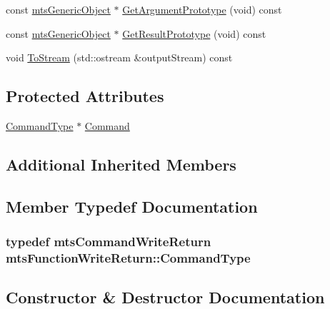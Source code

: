 \begin{DoxyCompactItemize}
\item 
const \hyperlink{classmts_generic_object}{mts\+Generic\+Object} $\ast$ \hyperlink{classmts_function_write_return_a36b02957cee1e6f144377862aa5c8819}{Get\+Argument\+Prototype} (void) const 
\item 
const \hyperlink{classmts_generic_object}{mts\+Generic\+Object} $\ast$ \hyperlink{classmts_function_write_return_a13ce482e4e34283e27f63654a61c3e67}{Get\+Result\+Prototype} (void) const 
\item 
void \hyperlink{classmts_function_write_return_a4cb7b8d402ca8863ccd6524253cb735f}{To\+Stream} (std\+::ostream \&output\+Stream) const 
\end{DoxyCompactItemize}
\subsection*{Protected Attributes}
\begin{DoxyCompactItemize}
\item 
\hyperlink{classmts_function_write_return_ac896d3571d680531a898daf398774881}{Command\+Type} $\ast$ \hyperlink{classmts_function_write_return_af81a9d61a27ec87109ad4cf07b7ba6ea}{Command}
\end{DoxyCompactItemize}
\subsection*{Additional Inherited Members}


\subsection{Member Typedef Documentation}
\hypertarget{classmts_function_write_return_ac896d3571d680531a898daf398774881}{}
\subsubsection[{Command\+Type}]{\setlength{\rightskip}{0pt plus 5cm}typedef {\bf mts\+Command\+Write\+Return} {\bf mts\+Function\+Write\+Return\+::\+Command\+Type}}\label{classmts_function_write_return_ac896d3571d680531a898daf398774881}


\subsection{Constructor \& Destructor Documentation}
\hypertarget{classmts_function_write_return_a888e54e6998747c0a9d960da550d9be8}{}
